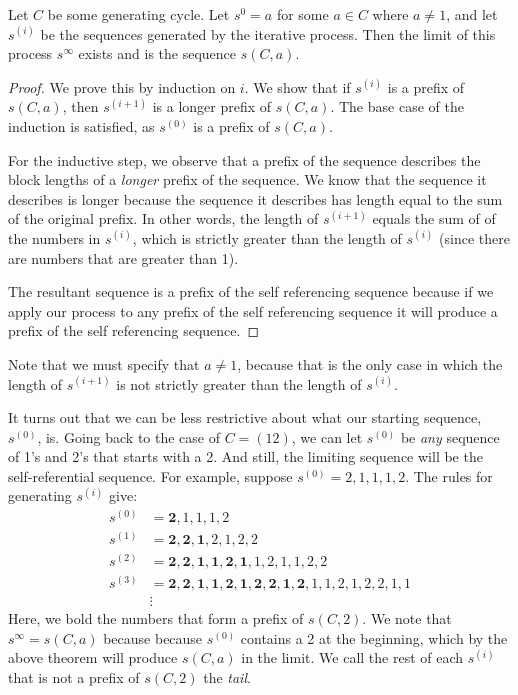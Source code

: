 \documentclass[runningheads,a4paper]{llncs}
\begin{document}
\begin{theorem}
Let $C$ be some generating cycle. Let $s^0 = a$ for some $a \in C$ where $a \neq 1$, and let $s^{(i)}$ be the sequences generated by the iterative process. Then the limit of this process $s^\infty$ exists and is the sequence $s(C,a)$.
\end{theorem}

\begin{proof}
We prove this by induction on $i$. We show that if $s^{(i)}$ is a prefix of $s(C,a)$, then $s^{(i+1)}$ is a longer prefix of $s(C,a)$. The base case of the induction is satisfied, as $s^{(0)}$ is a prefix of $s(C,a)$.

For the inductive step, we observe that a prefix of the sequence describes the block lengths of a \emph{longer} prefix of the sequence. We know that the sequence it describes is longer because the sequence it describes has length equal to the sum of the original prefix. In other words, the length of $s^{(i+1)}$ equals the sum of of the numbers in $s^{(i)}$, which is strictly greater than the length of $s^{(i)}$ (since there are numbers that are greater than 1). 

The resultant sequence is a prefix of the self referencing sequence because if we apply our process to any prefix of the self referencing sequence it will produce a prefix of the self referencing sequence.  
\end{proof}

Note that we must specify that $a \neq 1$, because that is the only case in which the length of $s^{(i+1)}$ is not strictly greater than the length of $s^{(i)}$. 

It turns out that we can be less restrictive about what our starting sequence, $s^{(0)}$, is. Going back to the case of $C = (1 2)$, we can let $s^{(0)}$ be \emph{any} sequence of 1's and 2's that starts with a 2. And still, the limiting sequence will be the self-referential sequence.
For example, suppose $s^{(0)} = 2,1,1,1,2$. The rules for generating $s^{(i)}$ give:
\begin{align*}
s^{(0)}&= \mathbf{2},1,1,1,2\\
s^{(1)} &= \mathbf{2,2,1},2,1,2,2\\
s^{(2)} &= \mathbf{2,2,1,1,2,1},1,2,1,1,2,2\\
s^{(3)} &= \mathbf{2,2,1,1,2,1,2,2,1,2},1,1,2,1,2,2,1,1\\
&\vdots
\end{align*}
Here, we bold the numbers that form a prefix of $s(C,2)$. We note that $s^\infty = s(C,a)$ because because $s^{(0)}$ contains a 2 at the beginning, which by the above theorem will produce $s(C,a)$ in the limit. We call the rest of each $s^{(i)}$ that is not a prefix of $s(C,2)$ the \emph{tail}.
\end{document}
